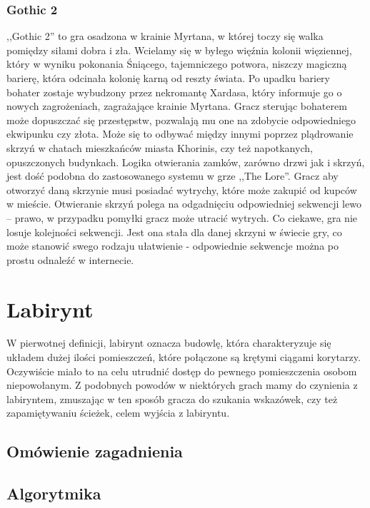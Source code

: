 \documentclass[oneside,polski,logo]{amuthesis}
\begin{document}
\subsubsection{Gothic 2}
\par ,,Gothic 2'' to gra osadzona w krainie Myrtana, w której toczy się walka pomiędzy siłami dobra i zła. Wcielamy się w byłego więźnia kolonii więziennej, który w wyniku pokonania Śniącego, tajemniczego potwora, niszczy magiczną barierę, która odcinała kolonię karną od reszty świata. Po upadku bariery bohater zostaje wybudzony przez nekromantę Xardasa, który informuje go o nowych zagrożeniach, zagrażające krainie Myrtana. Gracz sterując bohaterem może dopuszczać się przestępstw, pozwalają mu one na zdobycie odpowiedniego ekwipunku czy złota. Może się to odbywać między innymi poprzez plądrowanie skrzyń w chatach mieszkańców miasta Khorinis, czy też napotkanych, opuszczonych budynkach. 
Logika otwierania zamków, zarówno drzwi jak i skrzyń, jest dość podobna do zastosowanego systemu w grze ,,The Lore''. Gracz aby otworzyć daną skrzynie musi posiadać wytrychy, które może zakupić od kupców w mieście. Otwieranie skrzyń polega na odgadnięciu odpowiedniej sekwencji lewo – prawo, w przypadku pomyłki gracz może utracić wytrych. Co ciekawe, gra nie losuje kolejności sekwencji. Jest ona stała dla danej skrzyni w świecie gry, co może stanowić swego rodzaju ułatwienie - odpowiednie sekwencje można po prostu odnaleźć w internecie.


\section{Labirynt}
\par W pierwotnej definicji, labirynt oznacza budowlę, która charakteryzuje się układem dużej ilości pomieszczeń, które połączone są krętymi ciągami korytarzy. Oczywiście miało to na celu utrudnić dostęp do pewnego pomieszczenia osobom niepowołanym. Z podobnych powodów w niektórych grach mamy do czynienia z labiryntem, zmuszając w ten sposób gracza do szukania wskazówek, czy też zapamiętywaniu ścieżek, celem wyjścia z labiryntu. 
\subsection{Omówienie zagadnienia}
\subsection{Algorytmika}
\end{document}
